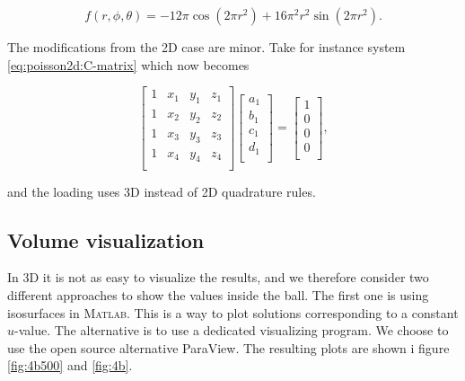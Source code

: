 \documentclass[paper=a4, fontsize=11pt]{scrartcl} %
\begin{document}
\[f(r,\phi,\theta) = -12\pi\cos(2\pi r^2) + 16\pi^2r^2\sin(2\pi r^2).\]

The modifications from the 2D case are minor. Take for instance system \eqref{eq:poisson2d:C-matrix} which now becomes

\[\begin{bmatrix}
  1 & x_1 & y_1 & z_1\\
  1 & x_2 & y_2 & z_2\\
  1 & x_3 & y_3 & z_3\\
  1 & x_4 & y_4 & z_4\\ \end{bmatrix}
\begin{bmatrix} a_1 \\ b_1\\ c_1 \\ d_1 \\ \end{bmatrix} =
\begin{bmatrix}
  1 \\ 0\\ 0 \\ 0 \\
\end{bmatrix},\]

and the loading uses 3D instead of 2D quadrature rules.
 
\subsection{Volume visualization}
In 3D it is not as easy to visualize the results, and we therefore consider two different approaches to show the values inside the ball. The first one is using isosurfaces in \textsc{Matlab}. This is a way to plot solutions corresponding to a constant $u$-value. The alternative is to use a dedicated visualizing program. We choose to use the open source alternative ParaView. The resulting plots are shown i figure \ref{fig:4b500} and \ref{fig:4b}.
\end{document}
